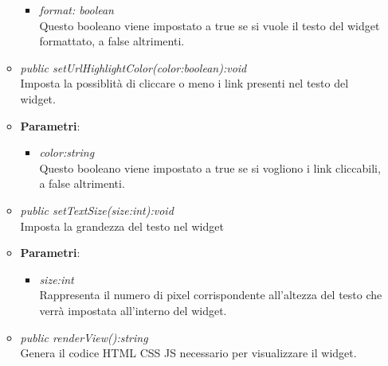 \begin{itemize}
\begin{itemize}
{\begin{itemize}
		\item \textit{format: boolean}\\
		Questo booleano viene impostato a true se si vuole il testo del widget formattato, a false altrimenti.
		\end{itemize}}
	\item \textit{public setUrlHighlightColor(color:boolean):void}\\
	Imposta la possiblità di cliccare o meno i link presenti nel testo del widget.
		\item{\textbf{Parametri}: \begin{itemize}
		\item \textit{color:string}\\
		Questo booleano viene impostato a true se si vogliono i link cliccabili, a false altrimenti.
		\end{itemize}}
	\item \textit{public setTextSize(size:int):void}\\
	Imposta la grandezza del testo nel widget
		\item{\textbf{Parametri}: \begin{itemize}
		\item \textit{size:int}\\
		Rappresenta il numero di pixel corrispondente all'altezza del testo che verrà impostata all'interno del widget.
		\end{itemize}}
	\item \textit{public renderView():string}\\
	Genera il codice HTML CSS JS necessario per visualizzare il widget.
	\end{itemize}
\end{itemize}

